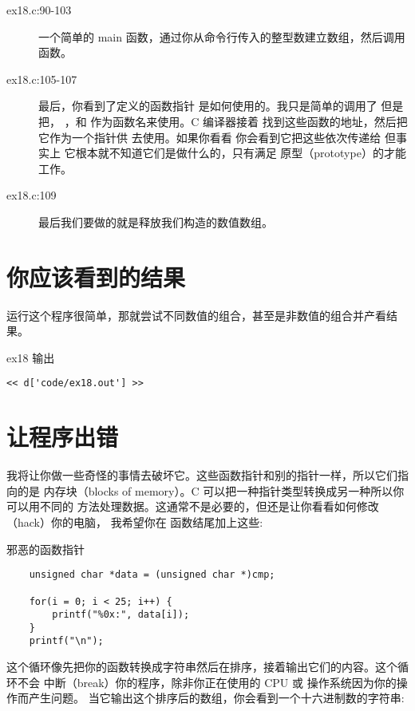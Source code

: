 \begin{description}
\item[ex18.c:90-103] 一个简单的 main 函数，通过你从命令行传入的整型数建立数组，然后调用 
     函数。
\item[ex18.c:105-107] 最后，你看到了定义的函数指针 
    是如何使用的。我只是简单的调用了  但是把，
    ，和  作为函数名来使用。C 编译器接着
    找到这些函数的地址，然后把它作为一个指针供  去使用。如果你看看
     你会看到它把这些依次传递给 但事实上 
    它根本就不知道它们是做什么的，只有满足 原型（prototype）的才能工作。
\item[ex18.c:109] 最后我们要做的就是释放我们构造的数值数组。
\end{description}


\section{你应该看到的结果}

运行这个程序很简单，那就尝试不同数值的组合，甚至是非数值的组合并产看结果。

\begin{code}{ex18 输出}
\begin{lstlisting}
<< d['code/ex18.out'] >>
\end{lstlisting}
\end{code}


\section{让程序出错}

我将让你做一些奇怪的事情去破坏它。这些函数指针和别的指针一样，所以它们指向的是
内存块（blocks of memory）。C 可以把一种指针类型转换成另一种所以你可以用不同的
方法处理数据。这通常不是必要的，但还是让你看看如何修改（hack）你的电脑，
我希望你在  函数结尾加上这些:

\begin{code}{邪恶的函数指针}
\begin{lstlisting}
    unsigned char *data = (unsigned char *)cmp;

    for(i = 0; i < 25; i++) {
        printf("%0x:", data[i]);
    }
    printf("\n");
\end{lstlisting}
\end{code}

这个循环像先把你的函数转换成字符串然后在排序，接着输出它们的内容。这个循环不会
中断（break）你的程序，除非你正在使用的 CPU 或 操作系统因为你的操作而产生问题。
当它输出这个排序后的数组，你会看到一个十六进制数的字符串:


